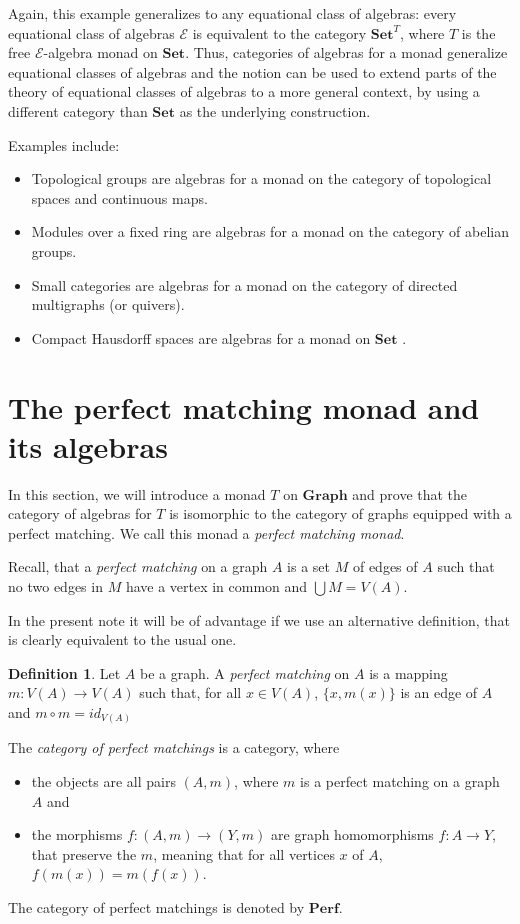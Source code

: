 \documentclass[reqno,A4paper]{amsart}
\newcommand{\E}{\mathcal{E}}
\newcommand{\Graph}{\mathbf{Graph}}
\newcommand{\Perf}{\mathbf{Perf}}
\newcommand{\Set}{\mathbf{Set}}
\theoremstyle{definition}
\newtheorem{definition}[theorem]{Definition}
\numberwithin{equation}{section}
\begin{document}
Again, this example generalizes to any equational class of algebras: every equational class
of algebras $\E$ is equivalent to the category $\Set^T$, where $T$ is the free $\E$-algebra
monad on $\Set$. Thus, categories of algebras for a monad generalize equational classes
of algebras and the notion can be used to extend parts of the theory of equational classes
of algebras to a more general context, by using a different category than $\Set$ as the underlying
construction.

Examples include:
\begin{itemize}
\item Topological groups are algebras for a monad on the category of topological spaces and continuous maps.
\item Modules over a fixed ring are algebras for a monad on the category of abelian groups.
\item Small categories are algebras for a monad on the category of directed multigraphs (or quivers).
\item Compact Hausdorff spaces are algebras for a monad on $\Set$ \cite{manes1974compact}.
\end{itemize}

\section{The perfect matching monad and its algebras}

In this section, we will introduce a monad $T$ on $\Graph$ and prove that
the category of algebras for $T$ is isomorphic to the category of
graphs equipped with a perfect matching. We call this monad a 
{\em perfect matching monad}.

Recall, that a {\em perfect matching} \cite{lovasz2009matching} on a graph $A$ is a set $M$ of edges of $A$ such that
no two edges in $M$ have a vertex in common and $\bigcup M=V(A)$.

In the present note it will be of advantage  
if we use an alternative definition, that is clearly
equivalent to the usual one.
\begin{definition}
Let $A$ be a graph. A {\em perfect matching} on $A$ 
is a mapping $m:V(A)\to V(A)$ such that, for all $x\in V(A)$,
$\{x,m(x)\}$ is an edge of $A$ and $m\circ m=id_{V(A)}$
\end{definition}

The {\em category of perfect matchings} is a category, where
\begin{itemize}
\item
the objects are all pairs $(A,m)$, where $m$ is a perfect matching on a graph $A$ and
\item
the morphisms $f:(A,m)\to (Y,m)$ are graph homomorphisms $f:A\to Y$, that preserve the
$m$, meaning that for all vertices $x$ of $A$, $f(m(x))=m(f(x))$.
\end{itemize}
The category of perfect matchings is denoted by $\Perf$.
\end{document}
